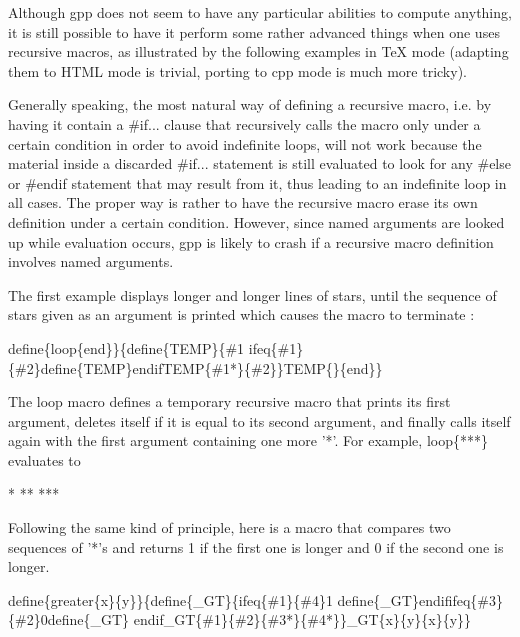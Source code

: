 Although gpp does not seem to have any particular abilities to compute
anything, it is still possible to have it perform some rather advanced things
when one uses recursive macros, as illustrated by the following examples in
TeX mode (adapting them to HTML mode is trivial, porting to cpp mode is much
more tricky). 

Generally speaking, the most natural way of defining a recursive macro, i.e.
by having it contain a \#if... clause that recursively calls the macro only
under a certain condition in order to avoid indefinite loops, will not work
because the material inside a discarded \#if... statement is still evaluated
to look for any \#else or \#endif statement that may result from it, thus
leading to an indefinite loop in all cases. The proper way is rather to have
the recursive macro erase its own definition under a certain condition.
However, since named arguments are looked up while evaluation occurs, gpp is
likely to crash if a recursive macro definition involves named arguments. 

The first example displays longer and longer lines of stars, until the
sequence of stars given as an argument is printed which causes the macro to
terminate : 

\begin{PRE}
  {\htmlBackslash}define\{{\htmlBackslash}loop\{end\}\}\{{\htmlBackslash}define\{TEMP\}\{\#1             
  {\htmlBackslash}ifeq\{\#1\}\{\#2\}{\htmlBackslash}define\{TEMP\}{\htmlBackslash}endif{\htmlBackslash}TEMP\{\#1*\}\{\#2\}\}{\htmlBackslash}TEMP\{\}\{{\htmlBackslash}end\}\}                
\end{PRE}

The loop macro defines a temporary recursive macro that prints its first
argument, deletes itself if it is equal to its second argument, and finally
calls itself again with the first argument containing one more '*'. For
example, {\htmlBackslash}loop\{***\} evaluates to 

\begin{PRE}
  *             
  **             
  ***             
\end{PRE}

Following the same kind of principle, here is a macro that compares two
sequences of '*'s and returns 1 if the first one is longer and 0 if the second
one is longer. 

\begin{PRE}
  {\htmlBackslash}define\{{\htmlBackslash}greater\{x\}\{y\}\}\{{\htmlBackslash}define\{\_GT\}\{{\htmlBackslash}ifeq\{\#1\}\{\#4\}1
  {\htmlBackslash}define\{\_GT\}{\htmlBackslash}endif{\htmlBackslash}ifeq\{\#3\}\{\#2\}0{\htmlBackslash}define\{\_GT\}
  {\htmlBackslash}endif{\htmlBackslash}\_GT\{\#1\}\{\#2\}\{\#3*\}\{\#4*\}\}{\htmlBackslash}\_GT\{{\htmlBackslash}x\}\{{\htmlBackslash}y\}\{{\htmlBackslash}x\}\{{\htmlBackslash}y\}\}
\end{PRE}

